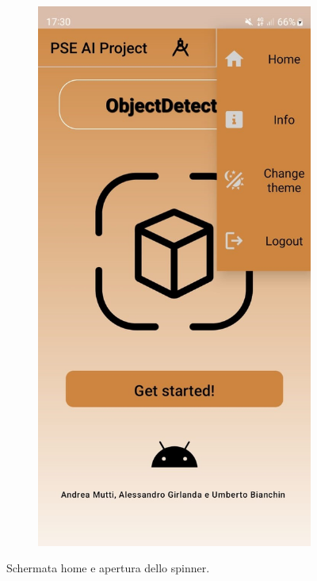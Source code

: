 \begin{figure}[H]
\begin{subfigure}[b]{0.3\textwidth}
  \end{subfigure}
  \begin{subfigure}[b]{0.3\textwidth}
    \includegraphics[width=\textwidth, height=0.4\textheight]{Immagini/App/home_spinner_chiaro.jpeg}
  \end{subfigure}
  \caption{Schermata home e apertura dello spinner.}
  \label{fig:home}
\end{figure}

